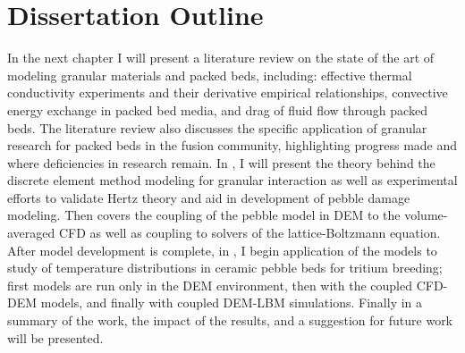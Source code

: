 \section{Dissertation Outline}
In the next chapter I will present a literature review on the state of the art of modeling granular materials and packed beds, including: effective thermal conductivity experiments and their derivative empirical relationships, convective energy exchange in packed bed media, and drag of fluid flow through packed beds. The literature review also discusses the specific application of granular research for packed beds in the fusion community, highlighting progress made and where deficiencies in research remain. In , I will present the theory behind the discrete element method modeling for granular interaction as well as experimental efforts to validate Hertz theory and aid in development of pebble damage modeling. Then  covers the coupling of the pebble model in DEM to the volume-averaged CFD as well as coupling to solvers of the lattice-Boltzmann equation. After model development is complete, in , I begin application of the models to study of temperature distributions in ceramic pebble beds for tritium breeding; first models are run only in the DEM environment, then with the coupled CFD-DEM models, and finally with coupled DEM-LBM simulations. Finally in  a summary of the work, the impact of the results, and a suggestion for future work will be presented.